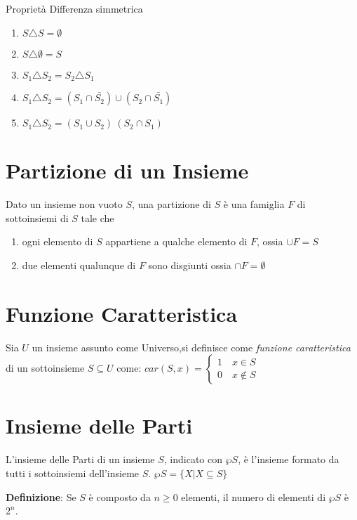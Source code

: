 Proprietà Differenza simmetrica
\begin{enumerate}
  \item $S \triangle S = \emptyset$
  \item $S \triangle \emptyset = S$
  \item $S_1 \triangle S_2 = S_2 \triangle S_1$
  \item $S_1 \triangle S_2 = (S_1 \cap \bar{S_2}) \cup (S_2 \cap \bar{S_1})$
  \item $S_1 \triangle S_2 = (S_1 \cup S_2) \ (S_2 \cap S_1)$
\end{enumerate}

\section{Partizione di un Insieme}
Dato un insieme non vuoto $S$, una partizione di $S$ è una famiglia $F$ di sottoinsiemi di $S$ tale che
\begin{enumerate}
    \item ogni elemento di $S$ appartiene a qualche elemento di $F$, ossia $\cup F = S$
    \item due elementi qualunque di $F$ sono disgiunti ossia $\cap F = \emptyset$
\end{enumerate}

\section{Funzione Caratteristica}
Sia $U$ un insieme assunto come Universo,si definisce come \emph{funzione caratteristica}
di un sottoinsieme $S \subseteq U$ come:
$car(S,x) = \begin{cases} 1 \quad x \in S \\ 0 \quad x \not \in S \end{cases}$

\section{Insieme delle Parti}
L'insieme delle Parti di un insieme $S$, indicato con $\wp S$, è l'insieme formato
da tutti i sottoinsiemi dell'insieme $S$. \newline
$\wp S = \{X | X \subseteq S\} $

\textbf{Definizione}: Se $S$ è composto da $n \geq 0$ elementi, il numero di elementi
di $\wp S$ è $2 ^ n$.



